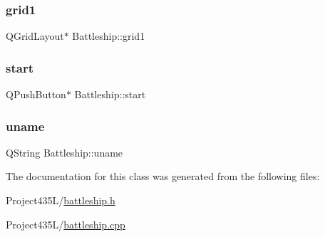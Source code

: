 \mbox{\label{classBattleship_a6c80b36f528440c9144085742fb218b6}} 
\subsubsection{\texorpdfstring{grid1}{grid1}}
{\footnotesize\ttfamily Q\+Grid\+Layout$\ast$ Battleship\+::grid1\hspace{0.3cm}{\ttfamily [private]}}

\mbox{\label{classBattleship_adac0fc24ec4d4edfc6aaad21b6ec314f}} 
\subsubsection{\texorpdfstring{start}{start}}
{\footnotesize\ttfamily Q\+Push\+Button$\ast$ Battleship\+::start\hspace{0.3cm}{\ttfamily [private]}}

\mbox{\label{classBattleship_aef5c3590a84c0d99e00d67796ef578bb}} 
\subsubsection{\texorpdfstring{uname}{uname}}
{\footnotesize\ttfamily Q\+String Battleship\+::uname\hspace{0.3cm}{\ttfamily [private]}}



The documentation for this class was generated from the following files\+:\begin{DoxyCompactItemize}
\item 
Project435\+L/\hyperlink{battleship_8h}{battleship.\+h}\item 
Project435\+L/\hyperlink{battleship_8cpp}{battleship.\+cpp}\end{DoxyCompactItemize}
